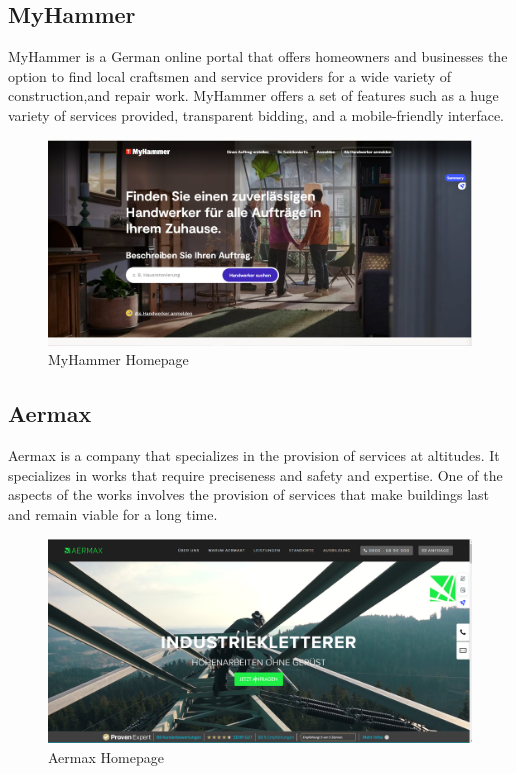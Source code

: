 \subsection{MyHammer}
MyHammer is a German online portal that offers homeowners and businesses the option to find local craftsmen and service providers for a wide variety of construction,and repair work.
MyHammer offers a set of features such as a huge variety of services provided, transparent bidding, and a mobile-friendly interface.


\begin{figure}[H]
    \centering
    \includegraphics[width=\linewidth]{src/assets/chapters/myHammer.PNG}
    \caption{MyHammer Homepage}
    \label{fig:myhammer_image}
\end{figure}



\subsection{Aermax}
Aermax is a company that specializes in the provision of services at altitudes. It specializes in works that require preciseness and safety and expertise. One of the aspects of the works involves the provision of services that make buildings last and remain viable for a long time. 


\begin{figure}[H]
    \centering
    \includegraphics[width=\linewidth]{src/assets/images/aermax.PNG}
    \caption{Aermax Homepage}
    \label{fig:aermax_image}
\end{figure}


